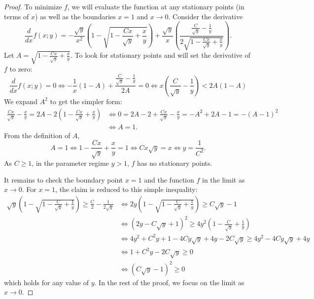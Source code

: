 \begin{proof}
To minimize $f$, we will evaluate the function at any stationary points (in terms of $x$) as well as the boundaries $x = 1$ and $x \to 0$.
Consider the derivative
\begin{equation*}\label{eq:derivative}
    \frac{d}{d x}f(x;y) = - \frac{\sqrt{y}}{x^2}\left(1 - \sqrt{1 - \frac{C x}{\sqrt{y}} + \frac{x}{y}}\right) + \frac{\sqrt{y}}{x}
    \left(\frac{\frac{C}{\sqrt{y}} - \frac{1}{y}}{2\sqrt{1 - \frac{C x}{\sqrt{y}} + \frac{x}{y}}}\right).
\end{equation*}
Let $A = \sqrt{1 - \frac{C x}{\sqrt{y}} + \frac{x}{y}}$.
To look for stationary points and will set the derivative of $f$ to zero:
\[
 \frac{d}{d x}f(x;y) = 0 \iff
 -\frac{1}{x} (1-A) + \frac{\frac{C}{\sqrt{y}} - \frac{1}{y}}{2A} = 0 \iff
 x \left(\frac{C}{\sqrt{y}} - \frac{1}{y}\right) <  2A(1-A)
\]
We expand $A^2$ to get the simpler form:
\begin{align*}
    \frac{C x}{\sqrt{y}} - \frac{x}{y} = 2A - 2\left(1 - \frac{C x}{\sqrt{y}} + \frac{x}{y}\right)
    &\iff 0 = 2A - 2 + \frac{C x}{\sqrt{y}} - \frac{x}{y} = -A^2 + 2A - 1 = -(A - 1)^2 \\
    &\iff A = 1.
\end{align*}
From the definition of $A$,
\[
    A = 1 \iff
    1 - \frac{C x}{\sqrt{y}} + \frac{x}{y} = 1 \iff
    C x \sqrt{y} = x \iff
    y = \frac{1}{C^2}.
\]
As $C \geq 1$, in the parameter regime $y > 1$, $f$ has no stationary points.

It remains to check the boundary point $x = 1$ and the function $f$ in the limit as $x \to 0$.
For $x=1$, the claim is reduced to this simple inequality:
\begin{align*}
    \sqrt{y}\left(1 - \sqrt{1 - \frac{C}{\sqrt{y}} + \frac{1}{y}}\right) \geq \frac{C}{2} - \frac{1}{2\sqrt{y}}
    &\iff 2y\left(1 - \sqrt{1 - \frac{C}{\sqrt{y}} + \frac{1}{y}}\right) \geq C\sqrt{y} - 1 \\
    &\iff (2y - C\sqrt{y} + 1)^2 \geq  4y^2 \left(1 - \frac{C}{\sqrt{y}} + \frac{1}{y}\right) \\
    &\iff 4y^2 + C^2y + 1 - 4Cy\sqrt{y} + 4y - 2C\sqrt{y} \geq 4y^2 - 4Cy\sqrt{y} + 4y \\
    &\iff 1 + C^2y -2C\sqrt{y} \geq 0 \\
    &\iff (C\sqrt{y}-1)^2 \geq 0
\end{align*}
which holds for any value of $y$.
In the rest of the proof, we focus on the limit as $x \to 0$.


\end{proof}
